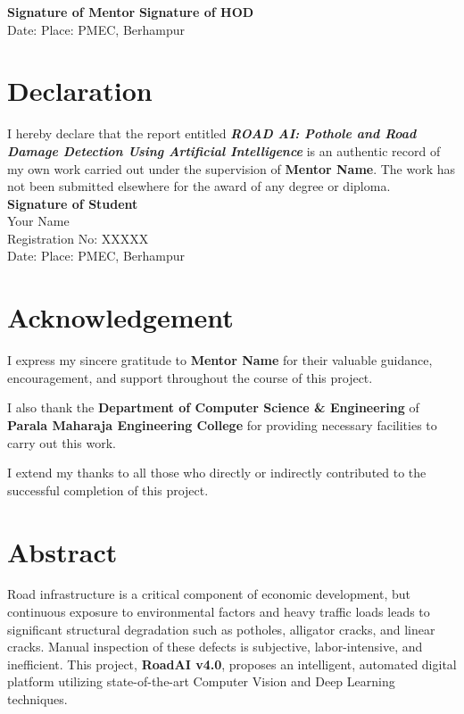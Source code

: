 \documentclass[12pt,a4paper]{report}
\begin{document}
\noindent\textbf{Signature of Mentor} \hfill \textbf{Signature of HOD}\\[1.2cm]

\noindent Date: \hfill Place: PMEC, Berhampur

\newpage

\chapter*{Declaration}
I hereby declare that the report entitled \textbf{\emph{ROAD AI: Pothole and Road Damage Detection Using Artificial Intelligence}} is an authentic record of my own work carried out under the supervision of \textbf{Mentor Name}. The work has not been submitted elsewhere for the award of any degree or diploma.\\[2cm]

\noindent\textbf{Signature of Student}\\
Your Name\\
Registration No: XXXXX\\[2cm]

\noindent Date: \hfill Place: PMEC, Berhampur

\newpage

\chapter*{Acknowledgement}
I express my sincere gratitude to \textbf{Mentor Name} for their valuable guidance, encouragement, and support throughout the course of this project.

I also thank the \textbf{Department of Computer Science \& Engineering} of \textbf{Parala Maharaja Engineering College} for providing necessary facilities to carry out this work.

I extend my thanks to all those who directly or indirectly contributed to the successful completion of this project.

\newpage

\chapter*{Abstract}
Road infrastructure is a critical component of economic development, but continuous exposure to environmental factors and heavy traffic loads leads to significant structural degradation such as potholes, alligator cracks, and linear cracks. Manual inspection of these defects is subjective, labor-intensive, and inefficient. This project, \textbf{RoadAI v4.0}, proposes an intelligent, automated digital platform utilizing state-of-the-art Computer Vision and Deep Learning techniques.
\end{document}
